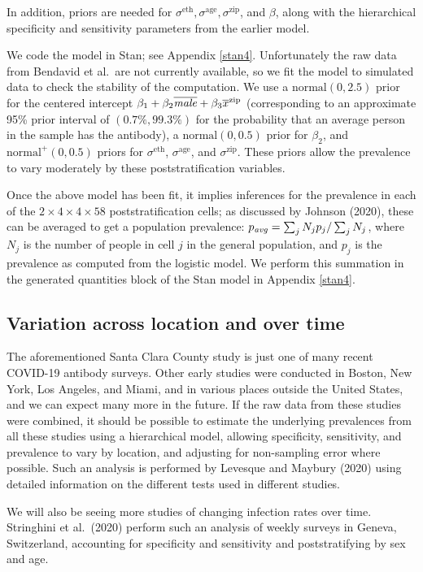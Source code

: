 \documentclass[11pt]{article}
\begin{document}
In addition, priors are needed for $\sigma^{\textrm{eth}}, \sigma^{\textrm{age}}, \sigma^{\textrm{zip}}$, and $\beta$, along with the hierarchical specificity and sensitivity parameters from the earlier model.

We code the model in Stan; see Appendix \ref{stan4}.  Unfortunately the raw data from Bendavid et al.\  are not currently available, so we fit the model to simulated data to check the stability of the computation.  We use a $\mbox{normal}(0,2.5)$ prior for the centered intercept  $\beta_1 + \beta_2\overline{\it male} + \beta_3\overline{x}^{\rm zip}$ (corresponding to an approximate 95\% prior interval of $(0.7\%, 99.3\%)$ for the probability that an average person in the sample has the antibody), a $\mbox{normal}(0,0.5)$ prior for $\beta_2$, and $\mbox{normal}^+(0, 0.5)$ priors for $\sigma^{\textrm{eth}}$, $\sigma^{\textrm{age}}$, and $\sigma^{\textrm{zip}}$.  These priors allow the prevalence to vary moderately by these poststratification variables.

Once the above model has been fit, it implies inferences for the prevalence in each of the $2\times 4 \times 4 \times 58$ poststratification cells; as discussed by Johnson (2020), these can be averaged to get a population prevalence:  $p_{\it avg} = \sum_jN_jp_j/\sum_jN_j$, where $N_j$ is the number of people in cell $j$ in the general population, and $p_j$ is the prevalence as computed from the logistic model.  We perform this summation in the generated quantities block of the Stan model in Appendix \ref{stan4}.

\subsection{Variation across location and over time}\label{muiltiple}
The aforementioned Santa Clara County study is just one of many recent COVID-19 antibody surveys.  Other early studies were conducted in Boston, New York, Los Angeles, and Miami, and in various places outside the United States, and we can expect many more in the future.  If the raw data from these studies were combined, it should be possible to estimate the underlying prevalences from all these studies using a hierarchical model, allowing specificity, sensitivity, and prevalence to vary by location, and adjusting for non-sampling error where possible.  Such an analysis is performed by Levesque and Maybury (2020) using detailed information on the different tests used in different studies.

We will also be seeing more studies of changing infection rates over time.  Stringhini et al.\ (2020) perform such an analysis of weekly surveys in Geneva, Switzerland, accounting for specificity and sensitivity and poststratifying by sex and age.
\end{document}
